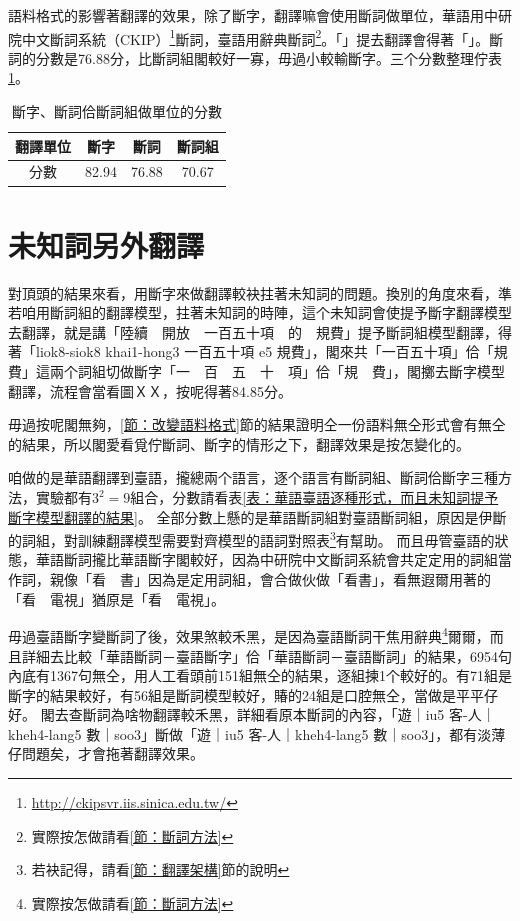 \documentclass[final,oneside,onecolumn,12pt,a4paper]{book}%
\begin{document}
語料格式的影響著翻譯的效果，除了斷字，翻譯嘛會使用斷詞做單位，華語用中研院中文斷詞系統（CKIP）\footnote{\url{http://ckipsvr.iis.sinica.edu.tw/}}斷詞，臺語用辭典斷詞\footnote{實際按怎做請看\ref{節：斷詞方法}}。「」提去翻譯會得著「」。斷詞的分數是76.88分，比斷詞組閣較好一寡，毋過小較輸斷字。三个分數整理佇表\ref{表：斷詞組、斷詞、斷字做單位的翻譯分數}。

\begin{table}
\caption{斷字、斷詞佮斷詞組做單位的分數}%
\label{表：斷詞組、斷詞、斷字做單位的翻譯分數}
\centering
\begin{tabular}{c|ccc}
翻譯單位 & 斷字 & 斷詞 & 斷詞組\\
\hline
分數　& 82.94 & 76.88 & 70.67\\
\end{tabular}
\end{table}

\section{未知詞另外翻譯}
\label{節：未知詞另外翻譯}

對頂頭的結果來看，用斷字來做翻譯較袂拄著未知詞的問題。換別的角度來看，準若咱用斷詞組的翻譯模型，拄著未知詞的時陣，這个未知詞會使提予斷字翻譯模型去翻譯，就是講「陸續　開放　一百五十項　的　規費」提予斷詞組模型翻譯，得著「liok8-siok8 khai1-hong3 一百五十項 e5 規費」，閣來共「一百五十項」佮「規費」這兩个詞組切做斷字「一　百　五　十　項」佮「規　費」，閣擲去斷字模型翻譯，流程會當看圖ＸＸ，按呢得著84.85分。

毋過按呢閣無夠，\ref{節：改變語料格式}節的結果證明仝一份語料無仝形式會有無仝的結果，所以閣愛看覓佇斷詞、斷字的情形之下，翻譯效果是按怎變化的。

咱做的是華語翻譯到臺語，攏總兩个語言，逐个語言有斷詞組、斷詞佮斷字三種方法，實驗都有$3^{2}=9$組合，分數請看表\ref{表：華語臺語逐種形式，而且未知詞提予斷字模型翻譯的結果}。
全部分數上懸的是華語斷詞組對臺語斷詞組，原因是伊斷的詞組，對訓練翻譯模型需要對齊模型的語詞對照表\footnote{若袂記得，請看\ref{節：翻譯架構}節的說明}有幫助。
而且毋管臺語的狀態，華語斷詞攏比華語斷字閣較好，因為中研院中文斷詞系統會共定定用的詞組當作詞，親像「看　書」因為是定用詞組，會合做伙做「看書」，看無遐爾用著的「看　電視」猶原是「看　電視」。

毋過臺語斷字變斷詞了後，效果煞較禾黑，是因為臺語斷詞干焦用辭典\footnote{實際按怎做請看\ref{節：斷詞方法}}爾爾，而且詳細去比較「華語斷詞－臺語斷字」佮「華語斷詞－臺語斷詞」的結果，6954句內底有1367句無仝，用人工看頭前151組無仝的結果，逐組揀1个較好的。有71組是斷字的結果較好，有56組是斷詞模型較好，賰的24組是口腔無仝，當做是平平仔好。
閣去查斷詞為啥物翻譯較禾黑，詳細看原本斷詞的內容，「遊｜iu5 客-人｜kheh4-lang5 數｜soo3」斷做「遊｜iu5 客-人｜kheh4-lang5 數｜soo3」，都有淡薄仔問題矣，才會拖著翻譯效果。
\end{document}
